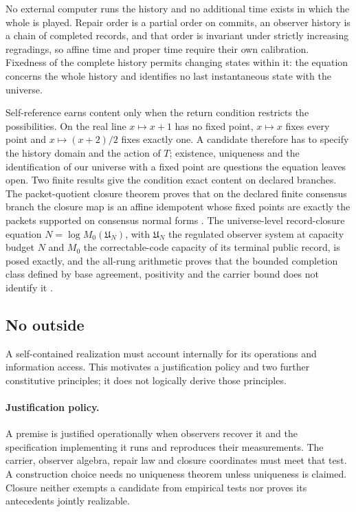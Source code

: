 \documentclass[11pt]{article}
\theoremstyle{definition}
\theoremstyle{remark}
\begin{document}
No external computer runs the history and no additional time exists in which
the whole is played. Repair order is a partial order on commits, an observer
history is a chain of completed records, and that order is invariant under
strictly increasing regradings, so affine time and proper time require their
own calibration. Fixedness of the complete history permits changing states
within it: the equation concerns the whole history and identifies no last
instantaneous state with the universe.

Self-reference earns content only when the return condition restricts the
possibilities. On the real line $x\mapsto x+1$ has no fixed point,
$x\mapsto x$ fixes every point and $x\mapsto(x+2)/2$ fixes exactly one. A
candidate therefore has to specify the history domain and the action of $T$;
existence, uniqueness and the identification of our universe with a fixed
point are questions the equation leaves open. Two finite results give the
condition exact content on declared branches. The packet-quotient closure
theorem proves that on the declared finite consensus branch the closure map
is an affine idempotent whose fixed points are exactly the packets supported
on consensus normal forms \cite{ophconsensus}. The universe-level
record-closure equation $N=\log M_0(\mathfrak U_N)$, with $\mathfrak U_N$
the regulated observer system at capacity budget $N$ and $M_0$ the
correctable-code capacity of its terminal public record, is posed exactly,
and the all-rung arithmetic proves that the bounded completion class defined
by base agreement, positivity and the carrier bound does not identify it
\cite{ophobservers}.

\subsection{No outside}
\label{sec:no-outside}

A self-contained realization must account internally for its operations and
information access. This motivates a justification policy and two further
constitutive principles; it does not logically derive those principles.

\paragraph{Justification policy.} A premise is justified operationally when
observers recover it and the specification implementing it runs and
reproduces their measurements. The carrier, observer algebra, repair law and
closure coordinates must meet that test. A construction choice needs no
uniqueness theorem unless uniqueness is claimed. Closure neither exempts a
candidate from empirical tests nor proves its antecedents jointly realizable.
\end{document}

